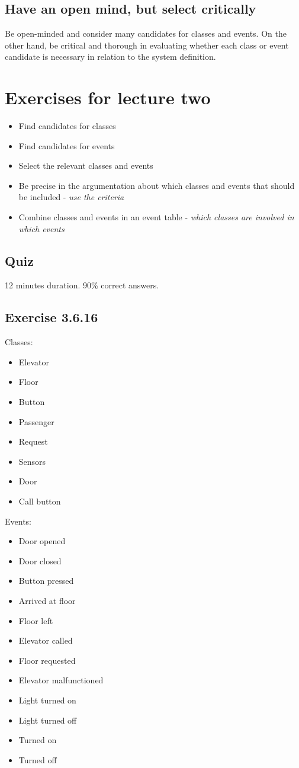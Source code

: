 \subsection{Have an open mind, but select critically}
Be open-minded and consider many candidates for classes and events. On the other hand, be critical and thorough in evaluating whether each class or event candidate is necessary in relation to the system definition.

\section{Exercises for lecture two}
\begin{itemize}
    \item Find candidates for classes
    \item Find candidates for events
    \item Select the relevant classes and events
    \item Be precise in the argumentation about which classes and events that should be included - \textit{use the criteria}
    \item Combine classes and events in an event table - \textit{which classes are involved in which events}
\end{itemize}
\subsection{Quiz}
12 minutes duration. 90\% correct answers.

\subsection{Exercise 3.6.16}
Classes:
\begin{itemize}
    \item Elevator
    \item Floor
    \item Button
    \item Passenger
    \item Request
    \item Sensors
    \item Door
    \item Call button
\end{itemize}

Events:
\begin{itemize}
    \item Door opened
    \item Door closed
    \item Button pressed
    \item Arrived at floor
    \item Floor left
    \item Elevator called
    \item Floor requested
    \item Elevator malfunctioned
    \item Light turned on
    \item Light turned off
    \item Turned on
    \item Turned off
\end{itemize}

